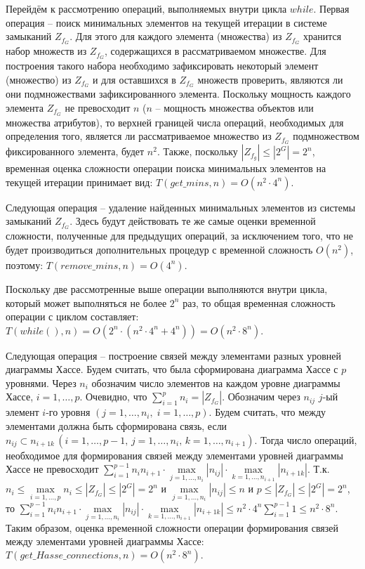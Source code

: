 \documentclass[spec, och, otchet, hidelinks]{SCWorks}
\begin{document}
\par Перейдём к рассмотрению операций, выполняемых внутри цикла $while$. Первая
операция -- поиск минимальных элементов на текущей итерации в системе замыканий
$Z_{f_G}$. Для этого для каждого элемента (множества) из $Z_{f_G}$ хранится набор множеств
из $Z_{f_G}$, содержащихся в рассматриваемом множестве. Для построения такого
набора необходимо зафиксировать некоторый элемент (множество) из $Z_{f_G}$ и для оставшихся
в $Z_{f_G}$ множеств проверить, являются ли они подмножествами зафиксированного
элемента. Поскольку мощность каждого элемента $Z_{f_G}$ не превосходит $n$ ($n$
-- мощность множества объектов или множества атрибутов), то верхней границей
числа операций, необходимых для определения того, является ли рассматриваемое
множество из $Z_{f_G}$ подмножеством фиксированного элемента, будет $n^2$.
Также, поскольку $|Z_{f_g}| \leq |2^G| = 2^n$, временная оценка сложности операции поиска
минимальных элементов на текущей итерации принимает вид: $T(get\_mins, n) =
O(n^2 \cdot 4^n)$.

\par Следующая операция -- удаление найденных минимальных элементов из системы
замыканий $Z_{f_G}$. Здесь будут действовать те же самые оценки временной
сложности, полученные для предыдущих операций, за исключением того, что не будет
производиться дополнительных процедур с временной сложность $O(n^2)$, поэтому:
$T(remove\_mins, n) = O(4^n)$. 

\par Поскольку две рассмотренные выше операции выполняются внутри цикла, который
может выполняться не более $2^n$ раз, то общая временная сложность операции с
циклом составляет: $T(while(), n) = O(2^n \cdot (n^2 \cdot 4^n + 4^n)) = O(n^2
\cdot 8^n)$.

\par Следующая операция -- построение связей между элементами разных уровней
диаграммы Хассе. Будем считать, что была сформирована диаграмма Хассе с $p$
уровнями. Через $n_i$ обозначим число элементов на каждом уровне диаграммы
Хассе, $i = 1,\dots,p$. Очевидно, что $\sum_{i = 1}^{p} n_i = |Z_{f_G}|.$
Обозначим через $n_{ij}$ $j$-ый элемент $i$-го уровня $(j = 1,\dots,n_i, \; i =
1,\dots,p)$. Будем считать, что между элементами должна быть сформирована связь,
если $n_{ij} \subset n_{i + 1k} \, (i = 1,\dots,p - 1, \, j = 1,\dots,n_i, \, k =
1,\dots,n_{i + 1})$. Тогда число операций, необходимое для формирования связей
между элементами уровней диаграммы Хассе не превосходит $\sum_{i = 1}^{p - 1}
n_i n_{i + 1} \cdot \max\limits_{j = 1,\dots,n_i} |n_{ij}| \cdot \max\limits_{k
  = 1,\dots,n_{i + 1}} |n_{i + 1k}|$. Т.к. $n_i \leq \max\limits_{i = 1,\dots,p}
n_i \leq |Z_{f_G}| \leq |2^G| = 2^n$ и $\max\limits_{j = 1,\dots,n_i} |n_{ij}|
\leq n$ и $p \leq |Z_{f_G}| \leq |2^G| = 2^n$, то $\sum_{i = 1}^{p - 1}
n_i n_{i + 1} \cdot \max\limits_{j = 1,\dots,n_i} |n_{ij}| \cdot \max\limits_{k
  = 1,\dots,n_{i + 1}} |n_{i + 1k}| \leq n^2 \cdot 4^n \sum_{i = 1}^{p - 1} 1
\leq n^2 \cdot 8^n.$ Таким образом, оценка временной сложности операции
формирования связей между элементами уровней диаграммы Хассе:
$T(get\_Hasse\_connections, n) = O(n^2 \cdot 8^n).$
\end{document}

